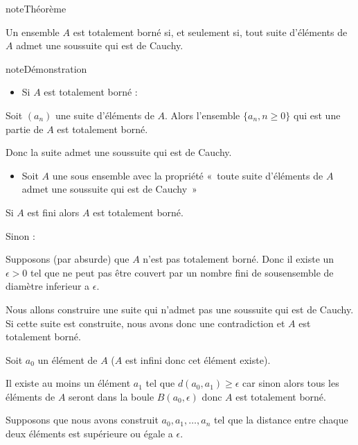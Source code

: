 \documentclass[letterpaper,10pt,french]{sphinxmanual}
\begin{document}
\begin{sphinxadmonition}{note}{Théorème}

\sphinxAtStartPar
Un ensemble \(A\) est totalement borné si, et seulement si, tout suite d’éléments de \(A\) admet une sous\sphinxhyphen{}suite qui est de Cauchy.
\end{sphinxadmonition}

\begin{sphinxadmonition}{note}{Démonstration}
\begin{itemize}
\item {} 
\sphinxAtStartPar
Si \(A\) est totalement borné :

\end{itemize}

\sphinxAtStartPar
Soit \((a_n)\) une suite d’éléments de \(A\). Alors l’ensemble \(\{a_n, n\geq 0\}\) qui est une partie de \(A\) est totalement borné.

\sphinxAtStartPar
Donc la suite admet une sous\sphinxhyphen{}suite qui est de Cauchy.
\begin{itemize}
\item {} 
\sphinxAtStartPar
Soit \(A\) une sous ensemble avec la propriété « toute suite d’éléments de \(A\) admet une sous\sphinxhyphen{}suite qui est de Cauchy »

\end{itemize}

\sphinxAtStartPar
Si \(A\) est fini alors \(A\) est totalement borné.

\sphinxAtStartPar
Sinon :

\sphinxAtStartPar
Supposons (par absurde) que \(A\) n’est pas totalement borné. Donc il existe un \(\epsilon>0\) tel que ne peut pas être couvert par un nombre fini de sous\sphinxhyphen{}ensemble de diamètre inferieur a \(\epsilon\).

\sphinxAtStartPar
Nous allons construire une suite qui n’admet pas une sous\sphinxhyphen{}suite qui est de Cauchy. Si cette suite est construite, nous avons donc une contradiction et \(A\) est totalement borné.

\sphinxAtStartPar
Soit \(a_0\) un élément de \(A\) (\(A\) est infini donc cet élément existe).

\sphinxAtStartPar
Il existe au moins un élément \(a_1\) tel que \(d(a_0, a_1)\geq\epsilon\) car sinon alors tous les éléments de \(A\) seront dans la boule \(B(a_0, \epsilon)\) donc \(A\) est totalement borné.

\sphinxAtStartPar
Supposons que nous avons construit \(a_0, a_1, \ldots, a_n\) tel que la distance entre chaque deux éléments est supérieure ou égale a \(\epsilon\).


\end{sphinxadmonition}
\end{document}
